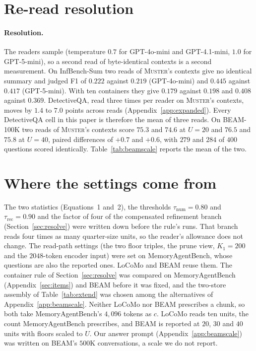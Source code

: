 \documentclass{article}
\newcommand{\sys}{\textsc{Muster}}
\begin{document}
\section{Re-read resolution}\label{app:items}

\paragraph{Resolution.} The readers sample (temperature $0.7$ for GPT-4o-mini and GPT-4.1-mini, $1.0$ for
GPT-5-mini), so a second read of byte-identical contexts is a second measurement. On InfBench-Sum two reads
of \sys{}'s contexts give no identical summary and judged F1 of $0.222$ against $0.219$ (GPT-4o-mini) and
$0.445$ against $0.417$ (GPT-5-mini). With ten containers they give $0.179$ against $0.198$ and $0.408$ against $0.369$.
DetectiveQA, read three times per reader on \sys{}'s contexts, moves by $1.4$ to $7.0$ points across reads
(Appendix~\ref{app:expanded}). Every DetectiveQA cell in this paper is therefore the mean of three reads. On
BEAM-100K two reads of \sys{}'s contexts score $75.3$ and $74.6$ at $U{=}20$ and $76.5$ and $75.8$ at
$U{=}40$, paired differences of $+0.7$ and $+0.6$, with $279$
and $284$ of $400$ questions scored identically. Table~\ref{tab:beamscale} reports the mean of the two.

\section{Where the settings come from}\label{app:fixed}

The two statistics (Equations~1 and~2), the thresholds $\tau_{\mathrm{num}}=0.80$ and $\tau_{\mathrm{rec}}=0.90$ and the factor of four of the compensated refinement branch (Section~\ref{sec:resolve}) were written down before the rule's runs. That branch reads four times as many quarter-size units, so the reader's allowance does not change. The read-path settings (the two floor triples, the prune view, $K_1=200$ and the $2048$-token encoder input) were set on MemoryAgentBench, whose questions are also the reported ones. LoCoMo and BEAM reuse them. The container rule of Section~\ref{sec:resolve} was compared on MemoryAgentBench (Appendix~\ref{sec:items}) and BEAM before it was fixed, and the two-store assembly of Table~\ref{tab:extend} was chosen among the alternatives of Appendix~\ref{app:beamscale}. Neither LoCoMo nor BEAM prescribes a chunk, so both take MemoryAgentBench's
$4{,}096$ tokens as $c$. LoCoMo reads ten units, the count MemoryAgentBench prescribes, and BEAM is reported at $20$, $30$ and
$40$ units with floors scaled to $U$. Our answer prompt (Appendix~\ref{app:beamscale}) was written on BEAM's $500$K
conversations, a scale we do not report.
\end{document}
